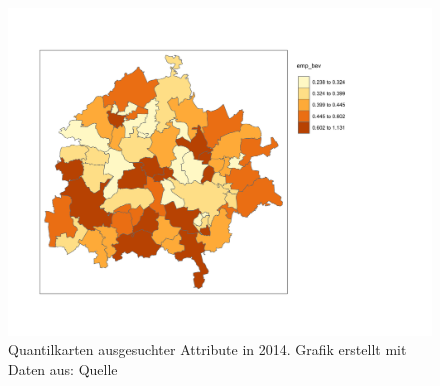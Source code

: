 \begin{figure}[!ht]
    \begin{boxit}
        \setlength{\abovedisplayskip}{0pt}
        \setlength{\belowdisplayskip}{0pt}
        \setlength{\abovedisplayshortskip}{0pt}
        \setlength{\belowdisplayshortskip}{0pt}
        \begin{center}
        \includegraphics[scale=0.5,trim={2cm 2.7cm 5cm 2.7cm},clip]{body/figures/emp-bev.pdf}
    \end{center}
    \end{boxit}
    \caption[Quantilkarten]{Quantilkarten ausgesuchter Attribute in 2014. Grafik erstellt mit Daten aus: Quelle}
    \label{fig_quantilmaps}
\end{figure}


